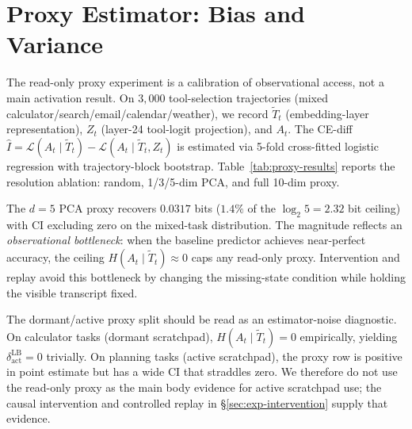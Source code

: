   \section{Proxy Estimator: Bias and Variance}
  \label{app:proxy-bias}

  The read-only proxy experiment is a calibration of observational access, not a
   main activation result. On $3{,}000$ tool-selection trajectories (mixed
  calculator/search/email/calendar/weather), we record $\tilde T_t$
  (embedding-layer representation), $Z_t$ (layer-24 tool-logit projection), and
  $A_t$. The CE-diff $\hat I = \mathcal{L}(A_t\mid\tilde T_t) -
  \mathcal{L}(A_t\mid\tilde T_t,Z_t)$ is estimated via 5-fold cross-fitted
  logistic regression with trajectory-block bootstrap.
  Table~\ref{tab:proxy-results} reports the resolution ablation: random,
  1/3/5-dim PCA, and full 10-dim proxy.

  The $d{=}5$ PCA proxy recovers $0.0317$ bits ($1.4\%$ of the $\log_2 5 = 2.32$
   bit ceiling) with CI excluding zero on the mixed-task distribution. The
  magnitude reflects an \emph{observational bottleneck}: when the baseline
  predictor achieves near-perfect accuracy, the ceiling $H(A_t \mid \tilde T_t)
  \approx 0$ caps any read-only proxy. Intervention and replay avoid this
  bottleneck by changing the missing-state condition while holding the visible
  transcript fixed.

  The dormant/active proxy split should be read as an estimator-noise
  diagnostic. On calculator tasks (dormant scratchpad), $H(A_t \mid \tilde T_t)
  = 0$ empirically, yielding $\delta_\text{act}^\text{LB} = 0$ trivially. On
  planning tasks (active scratchpad), the proxy row is positive in point
  estimate but has a wide CI that straddles zero. We therefore do not use the
  read-only proxy as the main body evidence for active scratchpad use; the
  causal intervention and controlled replay in \S\ref{sec:exp-intervention}
  supply that evidence.

